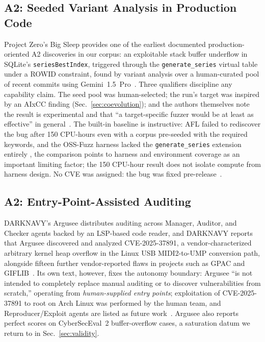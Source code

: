 \documentclass[conference,compsoc]{IEEEtran}
\begin{document}
\subsection{A2: Seeded Variant Analysis in Production Code}
Project Zero's Big Sleep provides one of the earliest documented production-oriented A2 discoveries in our corpus: an
exploitable stack buffer underflow in SQLite's \texttt{seriesBestIndex}, triggered through the
\texttt{generate\_series} virtual table under a ROWID constraint, found by variant analysis over
a human-curated pool of recent commits using Gemini~1.5~Pro~\cite{bigsleep2024}. Three
qualifiers discipline any capability claim. The seed pool was human-selected; the run's target
was inspired by an AIxCC finding (Sec.~\ref{sec:coevolution}); and the authors themselves note
the result is experimental and that ``a target-specific fuzzer would be at least as effective''
in general~\cite{bigsleep2024}. The built-in baseline is instructive: AFL failed to
rediscover the bug after 150 CPU-hours even with a corpus pre-seeded with the required keywords,
and the OSS-Fuzz harness lacked the \texttt{generate\_series} extension entirely
, the comparison points to harness and environment coverage as an important limiting factor; the 150 CPU-hour result does not isolate compute from harness design.
No CVE was assigned: the bug was fixed pre-release~\cite{bigsleep2024}.

\subsection{A2: Entry-Point-Assisted Auditing}
DARKNAVY's Argusee distributes auditing across Manager, Auditor, and Checker agents backed by an
LSP-based code reader, and DARKNAVY reports that Argusee discovered and analyzed CVE-2025-37891, a vendor-characterized arbitrary
kernel heap overflow in the Linux USB MIDI2-to-UMP conversion path, alongside fifteen further
vendor-reported flaws in projects such as GPAC and GIFLIB~\cite{darknavyargusee2025}. Its own
text, however, fixes the autonomy boundary: Argusee ``is not intended to completely replace
manual auditing or to discover vulnerabilities from scratch,'' operating from
\emph{human-supplied entry points}; exploitation of CVE-2025-37891 to root on Arch Linux was
performed by the human team, and Reproducer/Exploit agents are listed as future
work~\cite{darknavyargusee2025}. Argusee also reports perfect scores on CyberSecEval~2
buffer-overflow cases, a saturation datum we return to in Sec.~\ref{sec:validity}.
\end{document}
